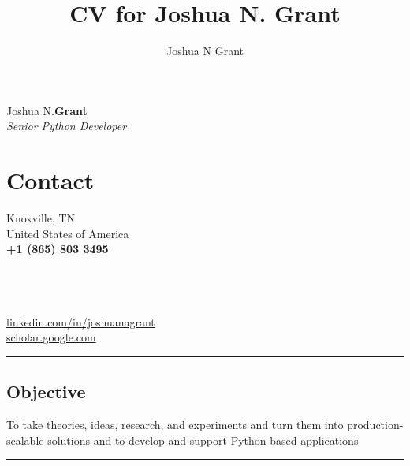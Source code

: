 \documentclass[10pt]{article}%
\author{Joshua N Grant}
\title{CV for Joshua N. Grant}
\begin{document}
\begin{minipage}[ht]{.33\linewidth}%
  \setlength{\headsep}{-10pt}%
  \setlength{\voffset}{-0.75in}%
  {\Large Joshua N.\huge\textbf{Grant}} \\
   \large \textit{Senior Python Developer}
\end{minipage}
\begin{minipage}[ht]{.25\linewidth}%
  \section*{\faUser{} Contact}%
  Knoxville, TN \\
  United States of America \\
  \textbf{+1 (865) 803 3495} \faMobile \\
\end{minipage}
\begin{minipage}[ht]{.5\linewidth}%
  \href{mailto:jngrant@live.com}{\color{linkcolor}{jngrant@live.com \faEnvelope}} \\
  \href{https://notjustadatum.blogspot.com}{\color{linkcolor}{notjustadatum.blogspot.com \faBold}} \\
  \href{https://github.com/sempervent}{\color{linkcolor}{github.com/sempervent \faGithubAlt}} \\
  \href{https://www.linkedin.com/in/joshua-grant-a3842968}{\color{linkcolor} {\small linkedin.com/in/joshuanagrant} \faLinkedin} \\
  \href{https://scholar.google.com/citations?user=vs-HJQcAAAAJ&hl=en}{\color{linkcolor} {scholar.google.com \faPencil}}
\end{minipage}
\par\noindent\rule{\textwidth}{0.4pt}
\begin{center}
\section*{\faBullseye{} Objective}%
To take theories, ideas, research, and experiments and turn them into production-scalable solutions and to develop and support Python-based applications
\end{center}
\par\noindent\rule{\textwidth}{0.4pt}
\end{document}
